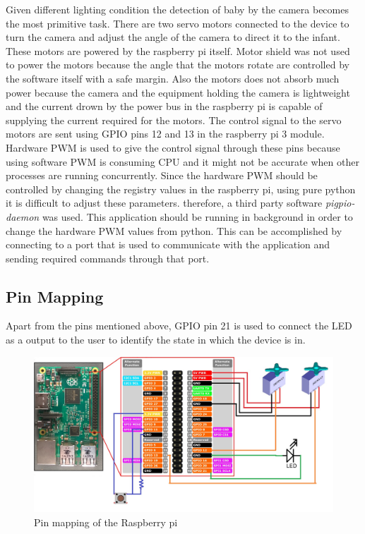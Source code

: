\documentclass{report}
\begin{document}
Given different lighting condition the detection of baby by the camera becomes the most primitive task. There are two servo motors connected to the device to turn the camera and adjust the angle of the camera to direct it to the infant. These motors are powered by the raspberry pi itself. Motor shield was not used to power the motors because the angle that the motors rotate are controlled by the software itself with a safe margin. Also the motors does not absorb much power because the camera and the equipment holding the camera is lightweight and the current drown by the power bus in the raspberry pi is capable of supplying the current required for the motors.\newline
The control signal to the servo motors are sent using GPIO pins 12 and 13 in the raspberry pi 3 module. Hardware PWM is used to give the control signal through these pins because using software PWM is consuming CPU and it might not be accurate when other processes are running concurrently. Since the hardware PWM should be controlled by changing the registry values in the raspberry pi, using pure python it is difficult to adjust these parameters. therefore, a third party software \emph{pigpio-daemon} was used. This application should be running in background in order to change the hardware PWM values from python. This can be accomplished by connecting to a port that is used to communicate with the application and sending required commands through that port.




\subsection{Pin Mapping}

Apart from the pins mentioned above, GPIO pin 21 is used to connect the LED as a output to the user to identify the state in which the device is in.

\begin{figure}[H]
    \centering
    \includegraphics[scale=0.3]{pinmapping.jpg}
    \caption{Pin mapping of the Raspberry pi}
    \label{fig:Pin mapping of the Raspberry pi}
\end{figure}
\end{document}
